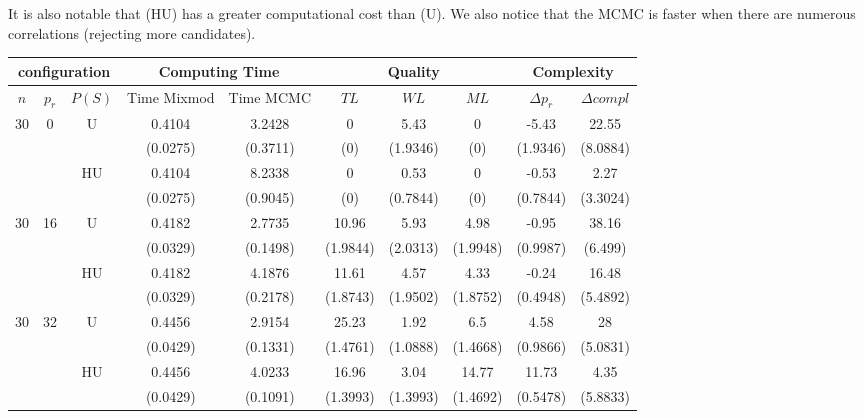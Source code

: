 \documentclass[11pt,a4paper]{article}
\begin{document}
 It is also notable that (HU) has a greater computational cost than (U). 
	We also notice that the MCMC is faster when there are numerous correlations (rejecting more candidates). 
\begin{table}[h!]
\centering
\begin{tabular}{|c|c|c|c|c|c|c|c|c|c|}
\hline
\multicolumn{3}{|c}{configuration}  &  \multicolumn{2}{|c}{Computing Time}  & \multicolumn{3}{|c}{Quality} & \multicolumn{2}{|c|}{Complexity}\\
\hline
$n$ & $p_r$ & $P(S)$ &  Time Mixmod  & Time MCMC  & $TL$ & $WL$ & $ML$ & $\Delta p_r$ & $\Delta compl$ \\
\hline %
30 & 0 & U&0.4104 & 3.2428 & 0 & 5.43 & 0 & -5.43 & 22.55  \\
& & & (0.0275) & (0.3711) & (0) & (1.9346) & (0) & (1.9346) & (8.0884) \\
 &  &HU &0.4104 & 8.2338 & 0 & 0.53 & 0 & -0.53 & 2.27  \\
& & & (0.0275) & (0.9045) & (0) & (0.7844) & (0) & (0.7844) & (3.3024) \\
\hline %
30 & 16 & U&0.4182 & 2.7735 & 10.96 & 5.93 & 4.98 & -0.95 & 38.16  \\
& & & (0.0329) & (0.1498) & (1.9844) & (2.0313) & (1.9948) & (0.9987) & (6.499) \\
 &  &HU &0.4182 & 4.1876 & 11.61 & 4.57 & 4.33 & -0.24 & 16.48  \\
& & & (0.0329) & (0.2178) & (1.8743) & (1.9502) & (1.8752) & (0.4948) & (5.4892) \\
\hline %
30 & 32 & U & 0.4456 & 2.9154 & 25.23 & 1.92 & 6.5 & 4.58 & 28  \\
& & & (0.0429) & (0.1331) & (1.4761) & (1.0888) & (1.4668) & (0.9866) & (5.0831) \\
 &  & HU & 0.4456 & 4.0233 & 16.96 & 3.04 & 14.77 & 11.73 & 4.35  \\
& & & (0.0429) & (0.1091) & (1.3993) & (1.3993) & (1.4692) & (0.5478) & (5.8833) \\
\hline
\hline %

\end{tabular}
\end{table}
\end{document}
